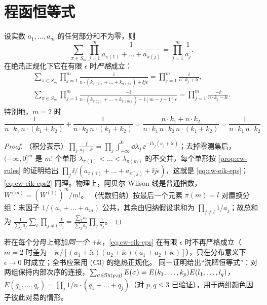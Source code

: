 \section{程函恒等式}\label{sec:cw-eikid}

\begin{lemma}[阿贝尔程函恒等式]\tagR\label{lem:cw-eikonal}
设实数 $a_1,\dots,a_m$ 的任何部分和不为零，则
\begin{equation}\label{eq:cw-eik}
\sum_{\pi\in S_m}\prod_{j=1}^m\frac{1}{a_{\pi(1)}+\dots+a_{\pi(j)}}=\prod_{j=1}^m\frac{1}{a_j}.
\end{equation}
在绝热正规化下它在有限 $\epsilon$ 时\emph{严格}成立：
\begin{gather}
\sum_{\pi\in S_m}\prod_{j=1}^m\frac{\ii}{n\cdot(k_{\pi(1)}+\dots+k_{\pi(j)})+\ii j\epsilon}=\prod_{j=1}^m\frac{\ii}{n\cdot k_j+\ii\epsilon},\label{eq:cw-eik-eps}\\
\sum_{\pi\in S_m}\prod_{j=1}^m\frac{-\ii}{n\cdot(k_{\pi(j)}+\dots+k_{\pi(m)})-\ii(m-j+1)\epsilon}=\prod_{j=1}^m\frac{-\ii}{n\cdot k_j-\ii\epsilon}.\label{eq:cw-eik-eps2}
\end{gather}
特别地，$m=2$ 时
\begin{equation}\label{eq:cw-eik2}
\frac{1}{n\cdot k_1\,n\cdot(k_1+k_2)}+\frac{1}{n\cdot k_2\,n\cdot(k_1+k_2)}=\frac{n\cdot k_1+n\cdot k_2}{n\cdot k_1\,n\cdot k_2\,n\cdot(k_1+k_2)}=\frac{1}{n\cdot k_1\,n\cdot k_2}.
\end{equation}
\end{lemma}

\begin{proof}
（积分表示）$\prod_j\frac{\ii}{a_j+\ii\epsilon}=\prod_j\int_{-\infty}^0\dd\lambda_j\,\ee^{-\ii\lambda_j(a_j+\ii\epsilon)}$；去掉零测集后，
$(-\infty,0]^m$ 是 $m!$ 个单形 $\lambda_{\pi(1)}<\dots<\lambda_{\pi(m)}$ 的不交并，每个单形按 \cref{prop:cw-rules} 的证明给出
$\prod_j\ii/(a_{\pi(1)}+\dots+a_{\pi(j)}+\ii j\epsilon)$，这就是 \cref{eq:cw-eik-eps}；\cref{eq:cw-eik-eps2} 同理。物理上，阿贝尔 Wilson 线是普通指数，
$W^{(m)}=(W^{(1)})^m/m!$。
（代数归纳）按最后一个元素 $\pi(m)=l$ 对置换分组：末因子 $1/(a_1+\dots+a_m)$ 公共，其余由归纳假设求和为
$\prod_{j\neq l}1/a_j$；故总和为 $\frac{1}{\sum_ja_j}\sum_l\prod_{j\neq l}\frac{1}{a_j}=\frac{\sum_la_l}{\sum_ja_j}\prod_j\frac1{a_j}$。
\end{proof}

\begin{remark}
若在每个分母上都加\emph{同一个} $+\ii\epsilon$，\cref{eq:cw-eik-eps} 在有限 $\epsilon$ 时不再严格成立（$m=2$ 时差为
$-\ii\epsilon/[(a_1+\ii\epsilon)(a_2+\ii\epsilon)(a_1+a_2+\ii\epsilon)]$），只在分布意义下 $\epsilon\to0$ 时成立；全书应采用 (C3) 的绝热正规化。
同一证明给出“洗牌恒等式”：对两组保持内部次序的连接，$\sum_{\sigma\in{\rm Sh}(p,q)}E(\sigma)=E(k_1,\dots,k_p)E(l_1,\dots,l_q)$，
$E(q_1,\dots,q_r)=\prod_j1/n\cdot(q_1+\dots+q_j)$（对 $p,q\le3$ 已验证），用于两组颜色因子彼此对易的情形。
\end{remark}

